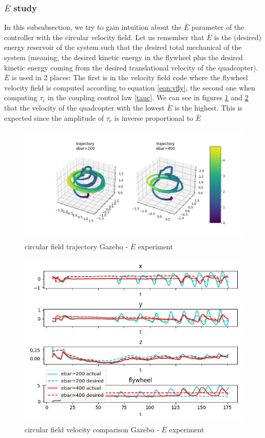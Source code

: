 \subsubsection{$\bar{E}$ study}
In this subsubsection, we try to gain intuition about the $\bar{E}$ parameter of the controller with the circular velocity field.
Let us remember that $\bar{E}$ is the (desired) energy reservoir of the system such that the desired total mechanical of the system (meaning, the desired kinetic energy in the flywheel plus the desired kinetic energy coming from the desired translational velocity of the quadcopter).
$\bar{E}$ is used in 2 places: The first is in the velocity field code where the flywheel velocity field is computed according to equation \ref{eqn:vfly}, the second one when computing $\tau_c$ in the coupling control law \ref{tauc}.
We can see in figures \ref{fig:trajgazebocircularebar} and \ref{fig:velgazebocircularebar} that the velocity of the quadcopter with the lowest $\bar{E}$ is the highest.
This is expected since the amplitude of $\tau_c$ is inverse proportional to $\bar{E}$
\begin{figure}[h!]
   \centering
   \includegraphics[width=\linewidth]{Images/gazebo_trajectory_ebar_circular.png}
   \caption{circular field trajectory Gazebo - $\bar{E}$ experiment}
   \label{fig:trajgazebocircularebar}
\end{figure}
\begin{figure}[h!]
   \centering
   \includegraphics[width=\linewidth]{Images/gazebo_circular_ebar_V.png}
   \caption{circular field velocity comparison Gazebo - $\bar{E}$ experiment}
   \label{fig:velgazebocircularebar}
\end{figure}
